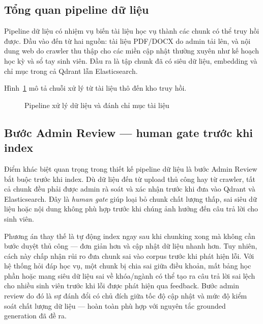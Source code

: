 \documentclass[../DoAn.tex]{subfiles}
\begin{document}
\subsection{Tổng quan pipeline dữ liệu}

Pipeline dữ liệu có nhiệm vụ biến tài liệu học vụ thành các chunk có thể truy
hồi được. Đầu vào đến từ hai nguồn: tài liệu PDF/DOCX do admin tải lên, và nội
dung web do crawler thu thập cho các miền cập nhật thường xuyên như kế hoạch học
kỳ và sổ tay sinh viên. Đầu ra là tập chunk đã có siêu dữ liệu, embedding và chỉ
mục trong cả Qdrant lẫn Elasticsearch.

Hình~\ref{fig:chapter3-ingestion} mô tả chuỗi xử lý từ tài liệu thô đến kho
truy hồi.

\begin{figure}[H]
    \centering
    \caption{Pipeline xử lý dữ liệu và đánh chỉ mục tài liệu}
    \label{fig:chapter3-ingestion}
\end{figure}

\subsection{Bước Admin Review --- human gate trước khi index}

Điểm khác biệt quan trọng trong thiết kế pipeline dữ liệu là bước Admin Review
bắt buộc trước khi index. Dù dữ liệu đến từ upload thủ công hay từ crawler, tất
cả chunk đều phải được admin rà soát và xác nhận trước khi đưa vào Qdrant và
Elasticsearch. Đây là \textit{human gate} giúp loại bỏ chunk chất lượng thấp,
sai siêu dữ liệu hoặc nội dung không phù hợp trước khi chúng ảnh hưởng đến câu
trả lời cho sinh viên.

Phương án thay thế là tự động index ngay sau khi chunking xong mà không cần
bước duyệt thủ công --- đơn giản hơn và cập nhật dữ liệu nhanh hơn. Tuy nhiên,
cách này chấp nhận rủi ro đưa chunk sai vào corpus trước khi phát hiện lỗi. Với
hệ thống hỏi đáp học vụ, một chunk bị chia sai giữa điều khoản, mất bảng học
phần hoặc mang siêu dữ liệu sai về khóa/ngành có thể tạo ra câu trả lời sai
lệch cho nhiều sinh viên trước khi lỗi được phát hiện qua feedback. Bước admin
review do đó là sự đánh đổi có chủ đích giữa tốc độ cập nhật và mức độ kiểm
soát chất lượng dữ liệu --- hoàn toàn phù hợp với nguyên tắc grounded generation
đã đề ra.
\end{document}
